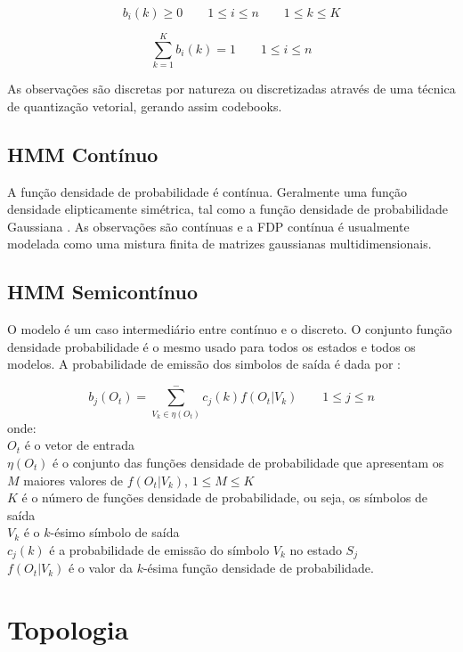 $$
 \displaystyle  b_i (k) \geq 0 \qquad 1 \leq i \leq n  \qquad 1 \leq k \leq K
$$

\begin{equation}
\displaystyle \sum_{k=1}^K b_i (k) = 1 \qquad 1 \leq i \leq n 
\end{equation}

As observações são discretas por natureza ou discretizadas através de uma técnica de quantização vetorial, gerando assim codebooks.
 
\subsection{HMM Contínuo}
\quad A função densidade de probabilidade é contínua. Geralmente uma função densidade elipticamente simétrica, tal como a função densidade de probabilidade Gaussiana \cite{fundRecFala}.
 As observações são contínuas e a FDP contínua é  usualmente modelada como uma mistura finita de matrizes gaussianas multidimensionais.
\subsection{HMM Semicontínuo}
\quad O modelo é um caso intermediário entre contínuo e o discreto. O conjunto função densidade probabilidade é o mesmo usado para todos os estados e todos os modelos. A probabilidade de emissão dos simbolos de saída é dada por :


\begin{equation}
\displaystyle b_j(O_t) =  \sum_{V_k \in \eta (O_t)}^-  c_j (k) f (O_t | V_k)   \qquad 1 \leq j \leq n 
\end{equation}
 onde:\\
$O_t$ é o vetor de entrada\\
$\eta(O_t)$ é o conjunto das funções densidade de probabilidade que apresentam os $M$ maiores valores de $f (O_t | V_k)$, $ 1 \leq M \leq K$\\
$K$ é o número de funções densidade de probabilidade, ou seja, os símbolos de saída\\
$V_k$ é o $k$-ésimo símbolo de saída\\
$ c_j (k)$ é a probabilidade de emissão do símbolo $V_k$ no estado $S_j$\\
$f (O_t | V_k)$ é o valor da $k$-ésima função densidade de probabilidade.



\section{Topologia}
\label{sec:topo}

